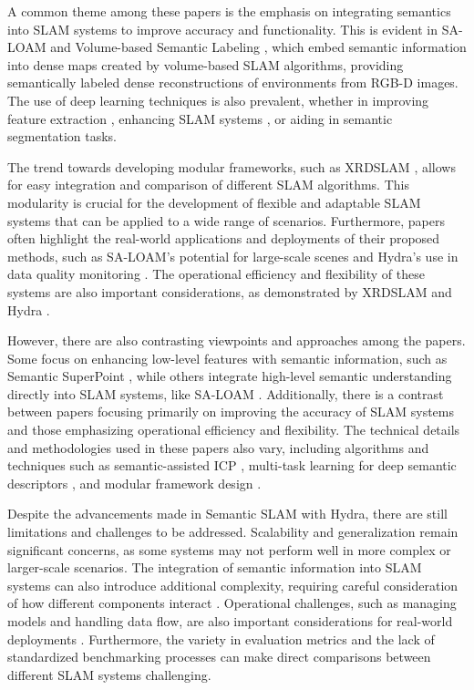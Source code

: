\documentclass[conference]{IEEEtran}
\begin{document}
A common theme among these papers is the emphasis on integrating semantics into SLAM systems to improve accuracy and functionality. This is evident in SA-LOAM \cite{b1} and Volume-based Semantic Labeling \cite{b4}, which embed semantic information into dense maps created by volume-based SLAM algorithms, providing semantically labeled dense reconstructions of environments from RGB-D images. The use of deep learning techniques is also prevalent, whether in improving feature extraction \cite{b3}, enhancing SLAM systems \cite{b2}, or aiding in semantic segmentation tasks.

The trend towards developing modular frameworks, such as XRDSLAM \cite{b2}, allows for easy integration and comparison of different SLAM algorithms. This modularity is crucial for the development of flexible and adaptable SLAM systems that can be applied to a wide range of scenarios. Furthermore, papers often highlight the real-world applications and deployments of their proposed methods, such as SA-LOAM's potential for large-scale scenes \cite{b1} and Hydra's use in data quality monitoring \cite{b5}. The operational efficiency and flexibility of these systems are also important considerations, as demonstrated by XRDSLAM \cite{b2} and Hydra \cite{b5}.

However, there are also contrasting viewpoints and approaches among the papers. Some focus on enhancing low-level features with semantic information, such as Semantic SuperPoint \cite{b3}, while others integrate high-level semantic understanding directly into SLAM systems, like SA-LOAM \cite{b1}. Additionally, there is a contrast between papers focusing primarily on improving the accuracy of SLAM systems and those emphasizing operational efficiency and flexibility. The technical details and methodologies used in these papers also vary, including algorithms and techniques such as semantic-assisted ICP \cite{b1}, multi-task learning for deep semantic descriptors \cite{b3}, and modular framework design \cite{b2}.

Despite the advancements made in Semantic SLAM with Hydra, there are still limitations and challenges to be addressed. Scalability and generalization remain significant concerns, as some systems may not perform well in more complex or larger-scale scenarios. The integration of semantic information into SLAM systems can also introduce additional complexity, requiring careful consideration of how different components interact \cite{b1}. Operational challenges, such as managing models and handling data flow, are also important considerations for real-world deployments \cite{b5}. Furthermore, the variety in evaluation metrics and the lack of standardized benchmarking processes can make direct comparisons between different SLAM systems challenging.
\end{document}
